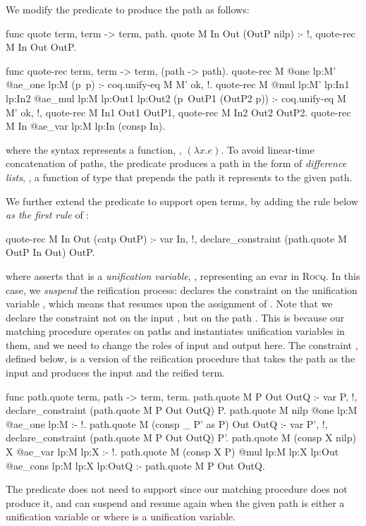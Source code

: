 \documentclass[a4paper,UKenglish,cleveref,autoref]{lipics-v2021}
\newcommand{\Rocq}{{\sffamily\scshape Rocq}\xspace}
\begin{document}
We modify the  predicate to produce the path as follows:
\begin{elpicode}
func quote term, term -> term, path.
quote M In Out (OutP nilp) :- !, quote-rec M In Out OutP.

func quote-rec term, term -> term, (path -> path).
quote-rec M {{ @one lp:M' }} {{ @ae_one lp:M }} (p\ p) :- coq.unify-eq M M' ok, !.
quote-rec M {{ @mul lp:M' lp:In1 lp:In2 }}
    {{ @ae_mul lp:M lp:Out1 lp:Out2 }} (p\ OutP1 (OutP2 p)) :-
  coq.unify-eq M M' ok, !, quote-rec M In1 Out1 OutP1, quote-rec M In2 Out2 OutP2.
quote-rec M In {{ @ae_var lp:M lp:In }} (consp In).
\end{elpicode}
where the syntax  represents a function, \ie, $(\lambda x. e)$.
To avoid linear-time concatenation of paths, the  predicate produces a path in the
form of \emph{difference lists}, \ie, a function of type  that prepends the path
it represents to the given path.

We further extend the  predicate to support open terms, by adding the rule below
\emph{as the first rule} of :
\begin{elpicode}
quote-rec M In Out (catp OutP) :-
  var In, !, declare_constraint (path.quote M OutP In Out) OutP.
\end{elpicode}
where  asserts that  is a \emph{unification variable}, \ie, representing an
evar in \Rocq.
In this case, we \emph{suspend} the reification process:  declares the
constraint  on the unification variable , which means that  resumes upon the
assignment of .
Note that we declare the constraint not on the input , but on the path .
This is because our matching procedure operates on paths and instantiates unification variables in
them, and we need to change the roles of input and output here.
The constraint , defined below, is a version of the reification
procedure that takes the path  as the input and produces the input and the reified term.
\begin{elpicode}
func path.quote term, path -> term, term.
path.quote M P Out OutQ :- var P, !, declare_constraint (path.quote M P Out OutQ) P.
path.quote M nilp {{ @one lp:M }} {{ @ae_one lp:M }} :- !.
path.quote M (consp _ P' as P) Out OutQ :-
  var P', !, declare_constraint (path.quote M P Out OutQ) P'.
path.quote M (consp X nilp) X {{ @ae_var lp:M lp:X }} :- !.
path.quote M (consp X P)
    {{ @mul lp:M lp:X lp:Out }} {{ @ae_cons lp:M lp:X lp:OutQ }} :-
  path.quote M P Out OutQ.
\end{elpicode}
The  predicate does not need to support  since our matching procedure
does not produce it, and can suspend and resume again when the given path is either a unification
variable or  where  is a unification variable.
\end{document}
